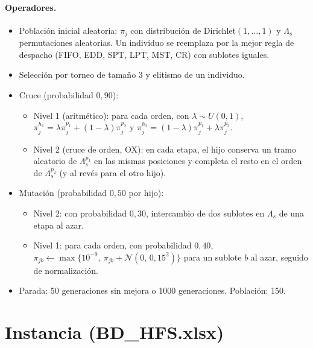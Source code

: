 \documentclass[11pt,a4paper]{article}
\begin{document}
\paragraph{Operadores.}
\begin{itemize}
  \item Población inicial aleatoria: $\pi_j$ con distribución de Dirichlet$(1,\dots,1)$
        y $\Lambda_s$ permutaciones aleatorias. Un individuo se reemplaza por
        la mejor regla de despacho (FIFO, EDD, SPT, LPT, MST, CR) con sublotes iguales.
  \item Selección por torneo de tamaño 3 y elitismo de un individuo.
  \item Cruce (probabilidad $0{,}90$):
    \begin{itemize}
      \item Nivel 1 (aritmético): para cada orden, con $\lambda \sim U(0,1)$,
            $\pi_j^{h_1} = \lambda\pi_j^{p_1} + (1-\lambda)\pi_j^{p_2}$ y
            $\pi_j^{h_2} = (1-\lambda)\pi_j^{p_1} + \lambda\pi_j^{p_2}$.
      \item Nivel 2 (cruce de orden, OX): en cada etapa, el hijo conserva un
            tramo aleatorio de $\Lambda_s^{p_1}$ en las mismas posiciones y
            completa el resto en el orden de $\Lambda_s^{p_2}$ (y al revés para el otro hijo).
    \end{itemize}
  \item Mutación (probabilidad $0{,}50$ por hijo):
    \begin{itemize}
      \item Nivel 2: con probabilidad $0{,}30$, intercambio de dos sublotes en $\Lambda_s$ de una etapa al azar.
      \item Nivel 1: para cada orden, con probabilidad $0{,}40$,
            $\pi_{jb} \leftarrow \max\{10^{-9},\ \pi_{jb} + \mathcal{N}(0,\,0{,}15^2)\}$
            para un sublote $b$ al azar, seguido de normalización.
    \end{itemize}
  \item Parada: 50 generaciones sin mejora o 1000 generaciones. Población: 150.
\end{itemize}

\section{Instancia (BD\_HFS.xlsx)}
\end{document}

